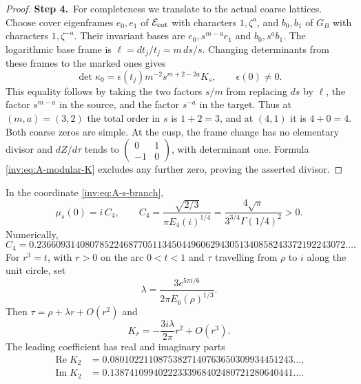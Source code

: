 \begin{proof}
\par\smallskip\noindent\textbf{Step 4.}\ For completeness we translate to the actual coarse lattices.  Choose
cover eigenframes $e_0,e_1$ of $\mathcal E_{\rm cot}$ with characters
$1,\zeta^a$, and $b_0,b_1$ of $G_B$ with characters
$1,\zeta^{-a}$.  Their invariant bases are
$e_0,s^{m-a}e_1$ and $b_0,s^ab_1$.  The logarithmic base frame is
$\ell=dt_j/t_j=m\,ds/s$.  Changing determinants from these frames
to the marked ones gives
\[
\det\kappa_0=\epsilon(t_j)m^{-2}s^{m+2-2a}K_s,
\qquad \epsilon(0)\ne0.
\]
This equality follows by taking the two factors $s/m$ from replacing
$ds$ by $\ell$, the factor $s^{m-a}$ in the source, and the factor
$s^{-a}$ in the target.  Thus at $(m,a)=(3,2)$ the total order in
$s$ is $1+2=3$, and at $(4,1)$ it is $4+0=4$.
Both coarse zeros are simple.  At the cusp, the frame change has
no elementary divisor and $dZ/d\tau$ tends to
$\left(\begin{smallmatrix}0&1\\-1&0\end{smallmatrix}\right)$,
with determinant one.  Formula \eqref{inv:eq:A-modular-K} excludes any
further zero, proving the asserted divisor.
\end{proof}

\begin{theorem}\label{inv:A2.2}
In the coordinate \eqref{inv:eq:A-s-branch},
\begin{equation}\label{inv:eq:A-mu-value}
\mu_s(0)=i\,C_4,
\qquad
C_4=\frac{\sqrt{2/3}}{\pi E_4(i)^{1/4}}
=\frac{4\sqrt\pi}{3^{3/4}\Gamma(1/4)^2}>0.
\end{equation}
Numerically,
\[
C_4=0.2366093140807852246877051134504496062943051340858243372192243072\ldots.
\]
For $r^3=t$, with $r>0$ on the arc $0<t<1$ and $\tau$ travelling
from $\rho$ to $i$ along the unit circle, set
\[
\lambda=\frac{3e^{5\pi i/6}}{2\pi E_6(\rho)^{1/3}}.
\]
Then $\tau=\rho+\lambda r+O(r^2)$ and
\[
K_r=-\frac{3i\lambda}{2\pi}r^2+O(r^3).
\]
The leading coefficient has real and imaginary parts
\[
\begin{aligned}
\operatorname{Re}K_2&=0.08010221108753827140763650309934451243\ldots,\\
\operatorname{Im}K_2&=0.13874109940222333968402480721280640441\ldots.
\end{aligned}
\]
\end{theorem}

